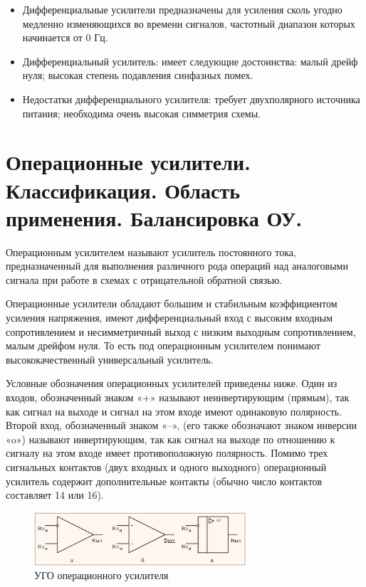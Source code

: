 \documentclass[unicode, 12pt, a4paper, oneside]{article}
\begin{document}
\begin{itemize}
\item Дифференциальные усилители предназначены для усиления сколь угодно медленно изменяющихся во времени сигналов, частотный диапазон которых начинается от 0 Гц.
\item Дифференциальный усилитель: имеет следующие достоинства: малый дрейф нуля; высокая степень подавления синфазных помех.
\item Недостатки дифференциального усилителя: требует двухполярного источника питания; необходима очень высокая симметрия схемы.
\end{itemize}


\section{Операционные усилители. Классификация. Область применения. Балансировка ОУ.}

Операционным усилителем называют усилитель постоянного тока, предназначенный для выполнения различного рода операций над аналоговыми сигнала при работе в схемах с отрицательной обратной связью.

Операционные усилители обладают большим и стабильным коэффициентом усиления напряжения, имеют дифференциальный вход с высоким входным сопротивлением и несимметричный выход с низким выходным сопротивлением, малым дрейфом нуля. То есть под операционным усилителем понимают высококачественный универсальный усилитель.

Условные обозначения операционных усилителей приведены ниже. Один из входов, обозначенный знаком «+» называют неинвертирующим (прямым), так как сигнал на выходе и сигнал на этом входе имеют одинаковую полярность. Второй вход, обозначенный знаком «–», (его также обозначают знаком инверсии «o») называют инвертирующим, так как сигнал на выходе по отношению к сигналу на этом входе имеет противоположную полярность. Помимо трех сигнальных контактов (двух входных и одного выходного) операционный усилитель содержит дополнительные контакты (обычно число контактов составляет 14 или 16).

\begin{figure}[H]
\centering
\includegraphics[width=0.7\textwidth]{8_oa_graphic.png}
\caption{УГО операционного усилителя}
\label{fig:8_oa_graphic}
\end{figure}
\end{document}
